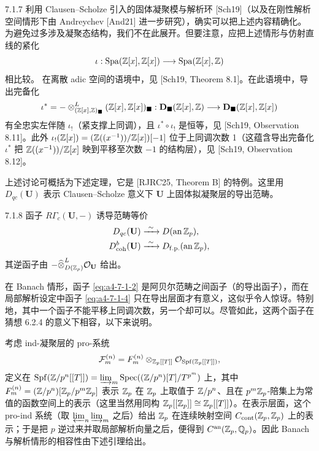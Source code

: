 \begin{rem}{7.1.7}\label{rem:a4-7-1-7}
利用 Clausen--Scholze 引入的固体凝聚模与解析环 [Sch19]（以及在刚性解析空间情形下由 Andreychev [And21] 进一步研究），确实可以把上述内容精确化。为避免过多涉及凝聚态结构，我们不在此展开。但要注意，应把上述情形与仿射直线的紧化
\[
\iota:\operatorname{Spa}(\mathbb{Z}[x],\mathbb{Z}[x])\longrightarrow\operatorname{Spa}(\mathbb{Z}[x],\mathbb{Z})
\]
相比较。
在离散 adic 空间的语境中，见 [Sch19, Theorem 8.1]。在此语境中，导出完备化
\[
\iota^*=-\otimes^{L}_{(\mathbb{Z}[x],\mathbb{Z})_{\blacksquare}}(\mathbb{Z}[x],\mathbb{Z}[x])_{\blacksquare}:
\mathbf D_{\blacksquare}(\mathbb{Z}[x],\mathbb{Z})\longrightarrow\mathbf D_{\blacksquare}(\mathbb{Z}[x],\mathbb{Z}[x])
\]
有全忠实左伴随 $\iota_!$（紧支撑上同调），且 $\iota^*\circ\iota_!$ 是恒等，见 [Sch19, Observation 8.11]。此外 $\iota_!(\mathbb{Z}[x])=(\mathbb{Z}((x^{-1}))/\mathbb{Z}[x])[-1]$ 位于上同调次数 1（这蕴含导出完备化 $\iota^*$ 把 $\mathbb{Z}((x^{-1}))/\mathbb{Z}[x]$ 映到平移至次数 $-1$ 的结构层），见 [Sch19, Observation 8.12]。
\end{rem}

上述讨论可概括为下述定理，它是 [RJRC25, Theorem B] 的特例。这里用 $D_{qc}(\mathbf U)$ 表示 Clausen--Scholze 意义下 $\mathbf U$ 上固体拟凝聚层的导出范畴。

\begin{thm}{7.1.8}\label{thm:a4-7-1-8}
函子 $R\Gamma_c(\mathbf U,-)$ 诱导范畴等价
\[
\begin{aligned}
D_{qc}(\mathbf U)&\xrightarrow{\ \sim\ } D(\mathrm{an}\,\mathbb{Z}_p),\\
D^b_{\mathrm{coh}}(\mathbf U)&\xrightarrow{\ \sim\ } D_{\mathrm{f.p.}}(\mathrm{an}\,\mathbb{Z}_p),
\end{aligned}
\]
其逆函子由 $-\widehat\otimes^{L}_{D(\mathbb{Z}_p)}\mathcal O_{\mathbf U}$ 给出。
\end{thm}

在 Banach 情形，函子 \eqref{eq:a4-7-1-2} 是阿贝尔范畴之间函子（的导出函子），而在局部解析设定中函子 \eqref{eq:a4-7-1-4} 只在导出层面才有意义，这似乎令人惊讶。特别地，其中一个函子不能平移上同调次数，另一个却可以。尽管如此，这两个函子在猜想 6.2.4 的意义下相容，以下来说明。

考虑 ind-凝聚层的 pro-系统
\[
\mathcal F^{(n)}_m=F^{(n)}_m\otimes_{\mathbb{Z}_p[[T]]}\mathcal O_{\operatorname{Spf}(\mathbb{Z}_p[[T]])},
\]
定义在 $\operatorname{Spf}(\mathbb{Z}/p^n[[T]])=\varinjlim_m\operatorname{Spec}((\mathbb{Z}/p^n)[T]/T^{p^m})$ 上，其中 $F^{(n)}_m=(\mathbb{Z}/p^n)[\mathbb{Z}_p/p^m\mathbb{Z}_p]$ 表示 $\mathbb{Z}_p$ 在 $\mathbb{Z}_p$ 上取值于 $\mathbb{Z}/p^n$、且在 $p^m\mathbb{Z}_p$-陪集上为常值的函数空间上的表示（这里当然用同构 $\mathbb{Z}_p[[\mathbb{Z}_p]]\cong\mathbb{Z}_p[[T]]$）。在表示层面，这个 pro-ind 系统（取 $\varprojlim_n\varinjlim_m$ 之后）给出 $\mathbb{Z}_p$ 在连续映射空间 $C_{\mathrm{cont}}(\mathbb{Z}_p,\mathbb{Z}_p)$ 上的表示；于是把 $p$ 逆过来并取局部解析向量之后，便得到 $C^{\mathrm{an}}(\mathbb{Z}_p,\mathbb{Q}_p)$。因此 Banach 与解析情形的相容性由下述引理给出。

